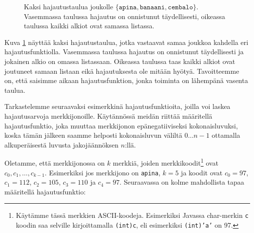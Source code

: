 \begin{figure}
\caption{Kaksi hajautustaulua joukolle $\{\texttt{apina},\texttt{banaani},\texttt{cembalo}\}$.
Vasemmassa taulussa hajautus on onnistunut täydellisesti,
oikeassa taulussa kaikki alkiot ovat samassa listassa.}
\label{fig:hajjak}
\end{figure}

Kuva \ref{fig:hajjak} näyttää kaksi hajautustaulua, jotka vastaavat
samaa joukkoa kahdella eri hajautusfunktiolla.
Vasemmassa taulussa hajautus on onnistunut täydellisesti
ja jokainen alkio on omassa listassaan.
Oikeassa taulussa taas kaikki alkiot ovat joutuneet samaan
listaan eikä hajautuksesta ole mitään hyötyä.
Tavoitteemme on, että saisimme aikaan hajautusfunktion,
jonka toiminta on lähempänä vasenta taulua.

Tarkastelemme seuraavaksi esimerkkinä hajautusfunktioita,
joilla voi laskea hajautusarvoja merkkijonoille.
Käytännössä meidän riittää määritellä hajautusfunktio,
joka muuttaa merkkijonon epänegatiiviseksi kokonaisluvuksi,
koska tämän jälkeen saamme helposti kokonaisluvun
väliltä $0 \dots n-1$ ottamalla alkuperäisestä luvusta jakojäännöksen $n$:llä.

Oletamme, että merkkijonossa on $k$ merkkiä,
joiden merkkikoodit\footnote{Käytämme tässä merkkien ASCII-koodeja.
Esimerkiksi Javassa char-merkin \texttt{c} koodin saa
selville kirjoittamalla \texttt{(int)c}, eli esimerkiksi
\texttt{(int)'a'} on 97.} ovat $c_0,c_1,\dots,c_{k-1}$.
Esimerkiksi jos merkkijono on \texttt{apina},
$k=5$ ja koodit ovat $c_0=97$, $c_1=112$, $c_2=105$,
$c_3=110$ ja $c_4=97$.
Seuraavassa on kolme mahdollista tapaa määritellä hajautusfunktio:


